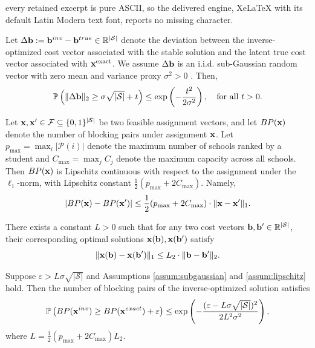 \documentclass[10pt,a4paper]{amsart}
\begin{document}
every retained excerpt is pure ASCII, so the delivered engine, XeLaTeX with its default Latin Modern text font, reports no missing character.
\begin{assumption}\label{assum:subgaussian}
Let \( \Delta {\bf b} := {\bf b}^{\textnormal{inv}} - {\bf b}^{\textnormal{true}} \in\mathbb{R}^{|\mathcal{S}|} \) denote the deviation between the inverse-optimized cost vector associated with the stable solution and the latent true cost vector associated with ${\bf x}^{\text{exact}}$. We assume \( \Delta {\bf b} \) is an i.i.d. sub-Gaussian random vector with zero mean and variance proxy \( \sigma^2 > 0\) .
Then, 
\[
\mathbb{P}\left( \|\Delta {\bf b}\|_2 \geq \sigma \sqrt{|\mathcal{S}|} + t \right)
\leq \exp\left( -\frac{t^2}{2\sigma^2} \right), \quad \text{for all } t > 0.
\]
\end{assumption}

\begin{lemma}\label{lem:lipschitz-bp-x}
Let \( {\bf x}, {\bf x}' \in \mathcal{F} \subseteq \{0,1\}^{|\mathcal{S}|} \) be two feasible assignment vectors, and let \( \textnormal{BP}({\bf x}) \) denote the number of blocking pairs under assignment \( {\bf x} \). Let $p_{\max} = \max_i |\mathcal{P}(i)|$ denote the maximum number of schools ranked by a student and $C_{\max} = \max_j C_j$ denote the maximum capacity across all schools.
Then \( \textnormal{BP}({\bf x}) \) is Lipschitz continuous with respect to the assignment under the \( \ell_1 \)-norm, with Lipschitz constant \( \frac{1}{2}(p_{\max} + 2C_{\max}) \). Namely, 
\[
\left| \textnormal{BP}({\bf x}) - \textnormal{BP}({\bf x}') \right|
\leq  \frac{1}{2}(p_{\max} + 2C_{\max}) \cdot \| {\bf x} - {\bf x}' \|_1.
\]
\end{lemma}

\begin{assumption}\label{assum:lipschitz}
There exists a constant \( L > 0 \) such that for any two cost vectors \( {\bf b}, {\bf b}' \in \mathbb{R}^{|\mathcal{S}|} \), their corresponding optimal solutions \( {\bf x}({\bf b}), {\bf x}({\bf b}') \) satisfy
\[
\|{\bf x}({\bf b}) - {\bf x}({\bf b}')\|_1 \leq L_2 \cdot \|{\bf b} - {\bf b}'\|_2.
\]
\end{assumption}

\begin{theorem} \label{thm:bp_tailbound}
Suppose \( \varepsilon > L \sigma \sqrt{|\mathcal{S}|} \) and Assumptions \ref{assum:subgaussian} and \ref{assum:lipschitz} hold. 
Then the number of blocking pairs of the inverse-optimized solution satisfies
\[
\mathbb{P}\left( \textnormal{BP}({\bf x}^{\textnormal{inv}}) \geq \textnormal{BP}({\bf x}^{\textnormal{exact}}) + \varepsilon \right)
\leq \exp\left( -\frac{(\varepsilon - L \sigma \sqrt{|\mathcal{S}|})^2}{2 L^2 \sigma^2} \right), 
\]
where $ L = \frac{1}{2}(p_{\max} + 2C_{\max}) L_2$.
\end{theorem}
\end{document}
